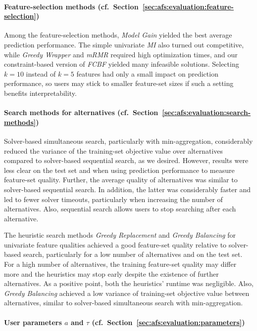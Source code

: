 \documentclass{article}
\theoremstyle{definition}
\begin{document}
\paragraph{Feature-selection methods (cf.~Section~\ref{sec:afs:evaluation:feature-selection})}

Among the feature-selection methods, \emph{Model Gain} yielded the best average prediction performance.
The simple univariate \emph{MI} also turned out competitive, while \emph{Greedy Wrapper} and \emph{mRMR} required high optimization times, and our constraint-based version of \emph{FCBF} yielded many infeasible solutions.
Selecting $k=10$ instead of $k=5$ features had only a small impact on prediction performance, so users may stick to smaller feature-set sizes if such a setting benefits interpretability.

\paragraph{Search methods for alternatives (cf.~Section~\ref{sec:afs:evaluation:search-methods})}

Solver-based simultaneous search, particularly with min-aggregation, considerably reduced the variance of the training-set objective value over alternatives compared to solver-based sequential search, as we desired.
However, results were less clear on the test set and when using prediction performance to measure feature-set quality.
Further, the average quality of alternatives was similar to solver-based sequential search.
In addition, the latter was considerably faster and led to fewer solver timeouts, particularly when increasing the number of alternatives.
Also, sequential search allows users to stop searching after each alternative.

The heuristic search methods \emph{Greedy Replacement} and \emph{Greedy Balancing} for univariate feature qualities achieved a good feature-set quality relative to solver-based search, particularly for a low number of alternatives and on the test set.
For a high number of alternatives, the training feature-set quality may differ more and the heuristics may stop early despite the existence of further alternatives.
As a positive point, both the heuristics' runtime was negligible.
Also, \emph{Greedy Balancing} achieved a low variance of training-set objective value between alternatives, similar to solver-based simultaneous search with min-aggregation.

\paragraph{User parameters $a$ and $\tau$ (cf.~Section~\ref{sec:afs:evaluation:parameters})}
\end{document}
